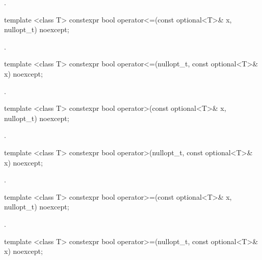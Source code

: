 \begin{itemdescr}
\pnum
\returns
{}.
\end{itemdescr}

%
\begin{itemdecl}
template <class T> constexpr bool operator<=(const optional<T>& x, nullopt_t) noexcept;
\end{itemdecl}

\begin{itemdescr}
\pnum
\returns
{}.
\end{itemdescr}

%
\begin{itemdecl}
template <class T> constexpr bool operator<=(nullopt_t, const optional<T>& x) noexcept;
\end{itemdecl}

\begin{itemdescr}
\pnum
\returns
{}.
\end{itemdescr}

%
\begin{itemdecl}
template <class T> constexpr bool operator>(const optional<T>& x, nullopt_t) noexcept;
\end{itemdecl}

\begin{itemdescr}
\pnum
\returns
{}.
\end{itemdescr}

%
\begin{itemdecl}
template <class T> constexpr bool operator>(nullopt_t, const optional<T>& x) noexcept;
\end{itemdecl}

\begin{itemdescr}
\pnum
\returns
{}.
\end{itemdescr}

%
\begin{itemdecl}
template <class T> constexpr bool operator>=(const optional<T>& x, nullopt_t) noexcept;
\end{itemdecl}

\begin{itemdescr}
\pnum
\returns
{}.
\end{itemdescr}

%
\begin{itemdecl}
template <class T> constexpr bool operator>=(nullopt_t, const optional<T>& x) noexcept;
\end{itemdecl}

